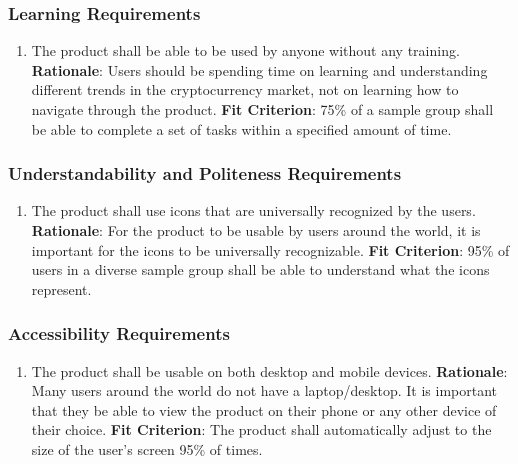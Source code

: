 \documentclass[12pt, titlepage]{article}
\begin{document}
\subsubsection{Learning Requirements}
\begin{enumerate}[nfr]
    \item The product shall be able to be used by anyone without any training.
    \newline \textbf{Rationale}: Users should be spending time on learning and understanding different trends in the cryptocurrency market, not on learning how to navigate through the product.
    \newline \textbf{Fit Criterion}: 75\% of a sample group shall be able to complete a set of tasks within a specified amount of time.
\end{enumerate}

\subsubsection{Understandability and Politeness Requirements}
\begin{enumerate}[nfr]
    \item The product shall use icons that are universally recognized by the users.
    \newline \textbf{Rationale}: For the product to be usable by users around the world, it is important for the icons to be universally recognizable.
    \newline \textbf{Fit Criterion}: 95\% of users in a diverse sample group shall be able to understand what the icons represent.
\end{enumerate}

\subsubsection{Accessibility Requirements}
\begin{enumerate}[nfr]
    \item The product shall be usable on both desktop and mobile devices.
    \newline \textbf{Rationale}: Many users around the world do not have a laptop/desktop. It is important that they be able to view the product on their phone or any other device of their choice.
    \newline \textbf{Fit Criterion}: The product shall automatically adjust to the size of the user's screen 95\% of times.
\end{enumerate}
\end{document}
